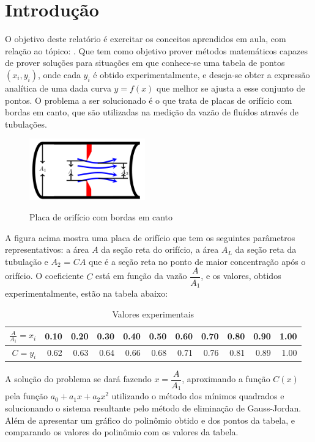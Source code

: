 \documentclass[12pt, hidelinks]{article}
\makeatletter
\let\thetitle\@title
\makeatother
\begin{document}
\section{Introdução}

O objetivo deste relatório é exercitar os conceitos aprendidos em aula, com relação ao tópico: \thetitle.
Que tem como objetivo prover métodos matemáticos capazes de prover soluções para situações em que conhece-se
uma tabela de pontos $(x_i, y_i)$, onde cada $y_i$ é obtido experimentalmente, e deseja-se obter a expressão
analítica de uma dada curva $y = f(x)$ que melhor se ajusta a esse conjunto de pontos.
O problema a ser solucionado é o que trata de placas de orifício com bordas em canto, que são utilizadas na
medição da vazão de fluídos através de tubulações.

\begin{figure}[!h]
  \centering
  \includegraphics[width=5cm]{figuras/problema.png}\\
  \caption{Placa de orifício com bordas em canto}\label{fig:placa}
\end{figure}

A figura acima mostra uma placa de orifício que tem os seguintes parâmetros representativos: a área $A$ da
seção reta do orifício, a área $A_L$ da seção reta da tubulação e $A_2$ = $CA$ que é a seção reta no ponto de maior
concentração após o orifício. O coeficiente $C$ está em função da vazão $\dfrac{A}{A_1}$, e os valores, obtidos experimentalmente,
estão na tabela abaixo:

\begin{table}[h]
  \centering
  \vspace{0.5cm}
  \begin{tabular}{|r|r|r|r|r|r|r|r|r|r|r|}
    \hline
      $\frac{A}{A_1} = x_i$ & 0.10 & 0.20 & 0.30 & 0.40 & 0.50 & 0.60 & 0.70 & 0.80 & 0.90 & 1.00\\
    \hline
      $C = y_i$ & 0.62 & 0.63 & 0.64 & 0.66 & 0.68 & 0.71 & 0.76 & 0.81 & 0.89 & 1.00\\
    \hline
  \end{tabular}
  \caption{Valores experimentais}
\end{table}

A solução do problema se dará fazendo $x = \dfrac{A}{A_1}$, aproximando a função $C(x)$ pela função $a_0 + a_1x + a_2x^2$ utilizando
o método dos mínimos quadrados e solucionando o sistema resultante pelo método de eliminação de Gauss-Jordan. Além de apresentar um
gráfico do polinômio obtido e dos pontos da tabela, e comparando os valores do polinômio com os valores da tabela.
\end{document}
